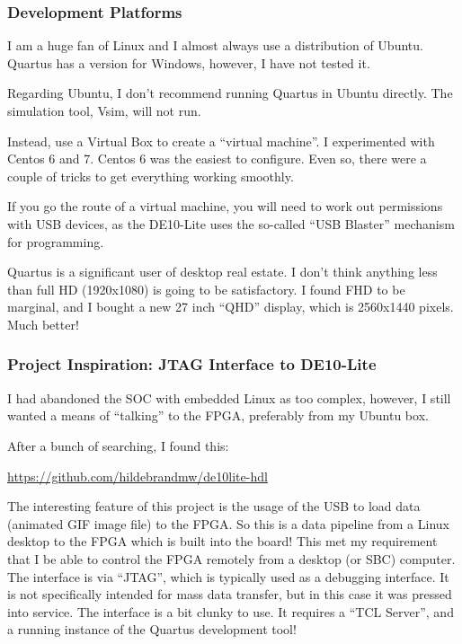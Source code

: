 \documentclass{beamer}
\begin{document}
\begin{frame}
\frametitle{Development Platforms}

I am a huge fan of Linux and I almost always use a distribution of Ubuntu.
Quartus has a version for Windows, however, I have not tested it.

Regarding Ubuntu, I don't recommend running Quartus in Ubuntu directly.  The simulation tool, Vsim, will not run.

Instead, use a Virtual Box to create a ``virtual machine''.  I experimented with Centos 6 and 7.  Centos 6 was the easiest to configure.  Even so, there were a couple of tricks to get everything working smoothly.

If you go the route of a virtual machine, you will need to work out permissions with USB devices, as the DE10-Lite uses the so-called ``USB Blaster'' mechanism for programming.

Quartus is a significant user of desktop real estate.  I don't think anything less than full HD (1920x1080) is going to be satisfactory.  I found FHD to be marginal, and I bought a new 27 inch ``QHD'' display, which is 2560x1440 pixels.  Much better!

\end{frame}

\begin{frame}
\frametitle{Project Inspiration:  JTAG Interface to DE10-Lite}

I had abandoned the SOC with embedded Linux as too complex, however, I still wanted a means of ``talking'' to the FPGA, preferably from my Ubuntu box.

After a bunch of searching, I found this:

\url{https://github.com/hildebrandmw/de10lite-hdl}

The interesting feature of this project is the usage of the USB to load data (animated GIF image file) to
the FPGA. So this is a data pipeline from a Linux desktop to the FPGA which is built into the board! This
met my requirement that I be able to control the FPGA remotely from a desktop (or SBC) computer.
The interface is via “JTAG”, which is typically used as a debugging interface. It is not specifically intended
for mass data transfer, but in this case it was pressed into service.
The interface is a bit clunky to use. It requires a “TCL Server”, and a running instance of the Quartus
development tool!

\end{frame}
\end{document}
